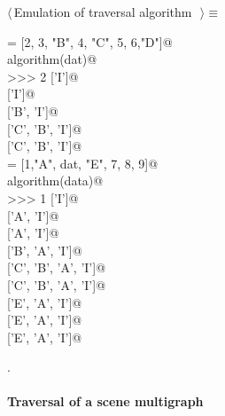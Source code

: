 \documentclass[11pt,oneside]{article}	%
\begin{document}
\begin{flushleft} \small \label{scrap33}
$\langle\,$Emulation of traversal algorithm\nobreak\ {\footnotesize {}}$\,\rangle\equiv$
\vspace{-1ex}
\begin{list}{}{} \item
\mbox{}\verb@dat = [2, 3, "B", 4, "C", 5, 6,"D"]@\\
\mbox{}\verb@print algorithm(dat)@\\
\mbox{}\verb@>>> 2 ['I']@\\
\mbox{} ['I']@\\
\mbox{} ['B', 'I']@\\
\mbox{} ['C', 'B', 'I']@\\
\mbox{} ['C', 'B', 'I']@\\
\mbox{}\verb@data = [1,"A", dat, "E", 7, 8, 9]@\\
\mbox{}\verb@print algorithm(data)@\\
\mbox{}\verb@>>> 1 ['I']@\\
\mbox{} ['A', 'I']@\\
\mbox{} ['A', 'I']@\\
\mbox{} ['B', 'A', 'I']@\\
\mbox{} ['C', 'B', 'A', 'I']@\\
\mbox{} ['C', 'B', 'A', 'I']@\\
\mbox{} ['E', 'A', 'I']@\\
\mbox{} ['E', 'A', 'I']@\\
\mbox{} ['E', 'A', 'I']@\\
\mbox{}\verb@@{\NWsep}
\end{list}
\vspace{-1ex}
\footnotesize\addtolength{\baselineskip}{-1ex}
\begin{list}{}{\setlength{\itemsep}{-\parsep}\setlength{\itemindent}{-\leftmargin}}
\item {\NWtxtMacroNoRef}.
\end{list}
\end{flushleft}

\paragraph{Traversal of a scene multigraph}
\end{document}
